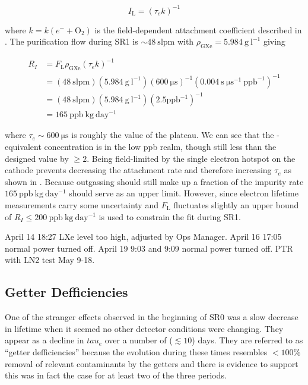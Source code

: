 \begin{equation}
I_{\mathrm{L}} = ( \tau_e k)^{-1}
\end{equation}

\noindent where $k = k(e^- + \mathrm{O_2})$ is the field-dependent \electron attachment coefficient described in
.  The purification flow during SR1 is ${\sim} 48\ \mathrm{slpm}$ with
$\rho_{\mathrm{GXe}} = 5.984\ \mathrm{g\ l^{-1}}$ giving

\begin{equation}
\begin{aligned}
R_I &= F_{\mathrm{L}} \rho_{\mathrm{GXe}} (\tau_e k)^{-1} \\[2pt]
&= (48\ \mathrm{slpm}) (5.984\ \mathrm{g\ l^{-1}}) (600\ \mathrm{\mu s})^{-1} (0.004\ \mathrm{s\ \mu s^{-1}\ ppb^{-1}})^{-1} \\[2pt]
&= (48\ \mathrm{slpm}) (5.984\ \mathrm{g\ l^{-1}}) (2.5 \mathrm{ppb^{-1}})^{-1} \\[2pt]
&= 165\ \mathrm{ppb\ kg\ day^{-1}}
\label{eq:electron_lifetime_model_outgassing_leak}
\end{aligned}
\end{equation}

\noindent where $\tau_e \sim 600\ \mathrm{\mu s}$ is roughly the value of the plateau.  We can see that the -equivalent
concentration is in the low ppb realm, though still less than the designed value by $\geq 2$.  Being field-limited by the single electron
hotspot on the cathode prevents decreasing the attachment rate and therefore increasing $\tau_e$ as shown in
.  Because outgassing should still make up a fraction
of the impurity rate $165\ \mathrm{ppb\ kg\ day^{-1}}$  should serve as an upper limit.  However, since electron lifetime measurements
carry some uncertainty and $F_{\mathrm{L}}$ fluctuates slightly an upper bound of $R_I \leq 200\ \mathrm{ppb\ kg\ day^{-1}}$ is used to
constrain the fit during SR1.

April 14 18:27 LXe level too high, adjusted by Ops Manager.  April 16 17:05 normal power turned off.  April 19 9:03 and 9:09 normal power
turned off.  PTR with LN2 test May 9-18.



\subsection{Getter Defficiencies}
\label{subsec:electron_lifetime_model_detector_effects_getter}
One of the stranger effects observed in the beginning of SR0 was a slow decrease in lifetime when it seemed no other detector conditions
were changing.  They
appear as a decline in $tau_e$ over a number of ($\lesssim 10$) days.  They are referred to as ``getter defficiencies'' because the
evolution during these times resembles $< 100\%$ removal of relevant
contaminants by the getters and there is evidence to support this was in fact the case for at least two of the three periods.

